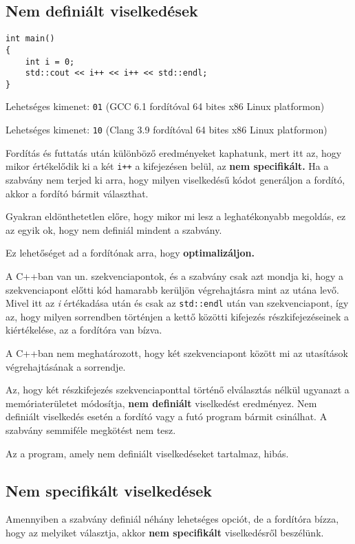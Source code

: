 \documentclass[a4paper,11.5pt,table]{article}
\begin{document}
	\subsection{Nem definiált viselkedések}
	\begin{lstlisting}
int main()
{
	int i = 0;
	std::cout << i++ << i++ << std::endl;
}
	\end{lstlisting}
	Lehetséges kimenet: \texttt{01} (GCC 6.1 fordítóval 64 bites x86 Linux platformon)
	
	Lehetséges kimenet: \texttt{10} (Clang 3.9 fordítóval 64 bites x86 Linux platformon)
	\medskip
	
	Fordítás és futtatás után különböző eredményeket kaphatunk, mert itt az, hogy mikor értékelődik ki a két \texttt{i++} a kifejezésen belül, az \textbf{nem specifikált.} Ha a szabvány nem terjed ki arra, hogy milyen viselkedésű kódot generáljon a fordító, akkor a fordító bármit választhat. 
	\medskip
	
	Gyakran eldönthetetlen előre, hogy mikor mi lesz a leghatékonyabb megoldás, ez az egyik ok, hogy nem definiál mindent a szabvány.
	\medskip
	
	Ez lehetőséget ad a fordítónak arra, hogy \textbf{optimalizáljon.} 
	\medskip
	
	A C++ban van un. szekvenciapontok, és a szabvány csak azt mondja ki, hogy a szekvenciapont előtti kód hamarabb kerüljön végrehajtásra mint az utána levő. Mivel itt az \textit{i} értékadása után és csak az \texttt{std::endl} után van szekvenciapont, így az, hogy milyen sorrendben történjen a kettő közötti kifejezés részkifejezéseinek a kiértékelése, az a fordítóra van bízva.
	\medskip
	
	A C++ban nem meghatározott, hogy két szekvenciapont között mi az utasítások végrehajtásának a sorrendje.
	
	\medskip
	Az, hogy két részkifejezés szekvenciaponttal történő elválasztás nélkül ugyanazt a memóriaterületet módosítja, \textbf{nem definiált} viselkedést eredményez. Nem definiált viselkedés esetén a fordító vagy a futó program bármit csinálhat. A szabvány semmiféle megkötést nem tesz.
	\begin{note}
		Az a program, amely nem definiált viselkedéseket tartalmaz, hibás.
	\end{note}
	\subsection{Nem specifikált viselkedések}
	Amennyiben a szabvány definiál néhány lehetséges opciót, de a fordítóra bízza, hogy az melyiket választja, akkor \textbf{nem specifikált} viselkedésről beszélünk.
	
\end{document}
